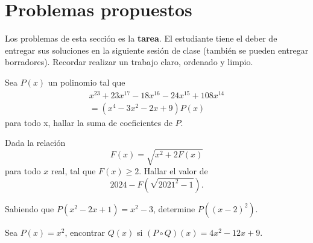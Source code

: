 \section{Problemas propuestos}

Los problemas de esta sección es la \textbf{tarea}.
El estudiante tiene el deber de entregar sus soluciones en la siguiente sesión de clase (también se pueden entregar borradores).
Recordar realizar un trabajo claro, ordenado y limpio.

\begin{multicols}{2}
    \begin{problem}
        Sea $P(x)$ un polinomio tal que
        \begin{align*}
            x^{23} + 23x^{17} - 18x^{16} - 24x^{15} + 108x^{14} \\= (x^4 - 3x^2 - 2x + 9)P(x)
        \end{align*}
        para todo x, hallar la suma de coeficientes de $P$.
    \end{problem}

    \begin{problem}
        Dada la relación
        \[
            F(x) = \sqrt {x^2 + 2F(x)}
        \]
        para todo $x$ real, tal que $F(x) \geq 2$.
        Hallar el valor de
        \[
            2024 - F\left(\sqrt {2021^2 - 1}\right).
        \]
    \end{problem}

    \begin{problem}
        Sabiendo que $P(x^2 - 2x + 1) = x^2 - 3$, determine $P((x - 2)^2).$
    \end{problem}

    \begin{problem}
        Sea $P(x) = x^2$, encontrar $Q(x)$ si $(P \circ Q)(x) = 4x^2 - 12x + 9$.
    \end{problem}
\end{multicols}